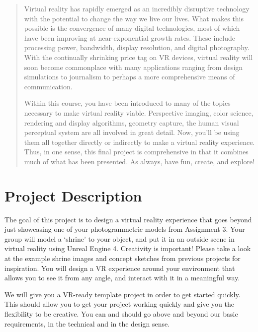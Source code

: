 \documentclass[12pt]{article}
\begin{document}
\maketitle

\begin{abstract}
Virtual reality has rapidly emerged as an incredibly disruptive technology with the potential to change the way we live our lives.  What makes this possible is the convergence of many digital technologies, most of which have been improving at near-exponential growth rates.  These include processing power, bandwidth, display resolution, and digital photography.  With the continually shrinking price tag on VR devices, virtual reality will soon become commonplace with many applications ranging from design simulations to journalism to perhaps a more comprehensive means of communication.
\vspace{10pt}

Within this course, you have been introduced to many of the topics necessary to make virtual reality viable.  Perspective imaging, color science, rendering and display algorithms, geometry capture, the human visual perceptual system are all involved in great detail.  Now, you’ll be using them all together directly or indirectly to make a virtual reality experience.  Thus, in one sense, this final project is comprehensive in that it combines much of what has been presented.  As always, have fun, create, and explore!

\end{abstract}

\section{Project Description}
The goal of this project is to design a virtual reality experience that goes beyond just showcasing one of your photogrammetric models from Assignment 3.  Your group will model a ‘shrine’ to your object, and put it in an outside scene in virtual reality using Unreal Engine 4.  Creativity is important!  Please take a look at the example shrine images and concept sketches from previous projects for inspiration.  You will design a VR experience around your environment that allows you to see it from any angle, and interact with it in a meaningful way.

We will give you a VR-ready template project in order to get started quickly.  This should allow you to get your project working quickly and give you the flexibility to be creative.  You can and should go above and beyond our basic requirements, in the technical and in the design sense.
\end{document}
